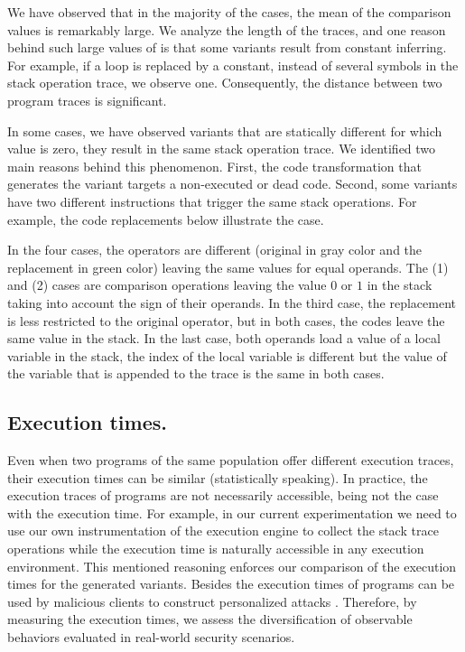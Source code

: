 We have observed that in the majority of the cases, the mean of the comparison values is remarkably large. We analyze the length of the traces, and one reason behind such large values of \DTW is that some variants result from constant inferring. For example, if a loop is replaced by a constant, instead of several symbols in the stack operation trace, we observe one. Consequently, the distance between two program traces is significant. 

In some cases, we have observed variants that are statically different for which \DTW value is zero, \ie they result in the same stack operation trace. We identified two main reasons behind this phenomenon. First, the code transformation that generates the variant targets a non-executed or dead code. Second, some variants have two different instructions that trigger the same stack operations. For example, the code replacements below illustrate the case. 



In the four cases, the operators are different (original in gray color and the replacement in green color) leaving the same values for equal operands.
The (1) and (2) cases are comparison operations leaving the value $0$ or $1$ in the stack taking into account the sign of their operands.  In the third case, the replacement is less restricted to the original operator, but in both cases, the codes leave the same value in the stack. In the last case, both operands load a value of a local variable in the stack, the index of the local variable is different but the value of the variable that is appended to the trace is the same in both cases. 

\subsection*{Execution times.}


Even when two programs of the same population offer different execution traces, their execution times can be similar (statistically speaking). In practice, the execution traces of \wasm programs are not necessarily accessible, being not the case with the execution time. For example, in our current experimentation we need to use our own instrumentation of the execution engine to collect the stack trace operations while the execution time is naturally accessible in any execution environment. This mentioned reasoning enforces our comparison of the execution times for the generated variants. Besides the execution times of programs can be used by malicious clients to construct personalized attacks \cite{morgan2015web}. Therefore, by measuring the execution times, we assess the diversification of observable behaviors evaluated in real-world security scenarios.



